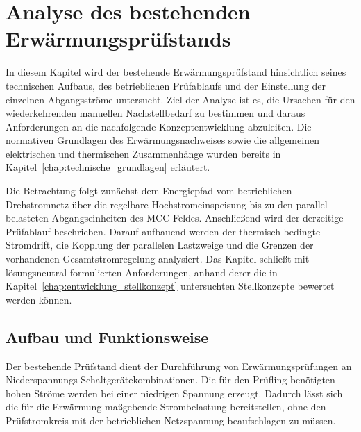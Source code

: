 \section{Analyse des bestehenden Erwärmungsprüfstands}
\label{chap:analyse_pruefstand}

In diesem Kapitel wird der bestehende Erwärmungsprüfstand hinsichtlich seines
technischen Aufbaus, des betrieblichen Prüfablaufs und der Einstellung der
einzelnen Abgangsströme untersucht. Ziel der Analyse ist es, die Ursachen für
den wiederkehrenden manuellen Nachstellbedarf zu bestimmen und daraus
Anforderungen an die nachfolgende Konzeptentwicklung abzuleiten. Die
normativen Grundlagen des Erwärmungsnachweises sowie die allgemeinen
elektrischen und thermischen Zusammenhänge wurden bereits in
Kapitel~\ref{chap:technische_grundlagen} erläutert.

Die Betrachtung folgt zunächst dem Energiepfad vom betrieblichen
Drehstromnetz über die regelbare Hochstromeinspeisung bis zu den parallel
belasteten Abgangseinheiten des MCC-Feldes. Anschließend wird der derzeitige
Prüfablauf beschrieben. Darauf aufbauend werden der thermisch bedingte
Stromdrift, die Kopplung der parallelen Lastzweige und die Grenzen der
vorhandenen Gesamtstromregelung analysiert. Das Kapitel schließt mit
lösungsneutral formulierten Anforderungen, anhand derer die in
Kapitel~\ref{chap:entwicklung_stellkonzept} untersuchten Stellkonzepte
bewertet werden können.


\subsection{Aufbau und Funktionsweise}
\label{sec:aufbau_funktionsweise_pruefstand}

Der bestehende Prüfstand dient der Durchführung von Erwärmungsprüfungen an
Niederspannungs-Schaltgerätekombinationen. Die für den Prüfling benötigten
hohen Ströme werden bei einer niedrigen Spannung erzeugt. Dadurch lässt sich
die für die Erwärmung maßgebende Strombelastung bereitstellen, ohne den
Prüfstromkreis mit der betrieblichen Netzspannung beaufschlagen zu müssen.

